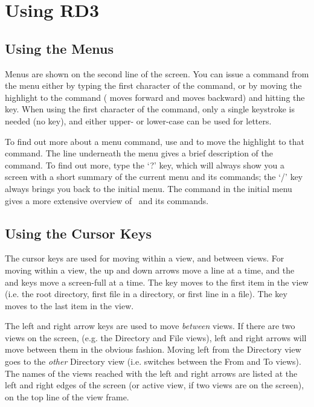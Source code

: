 \chapter{Using RD3}
 
\section{Using the Menus}
 
Menus are shown on the second line of the screen.  You can issue a
command from the menu either by typing the first character of the
command, or by moving the highlight to the command ( moves
forward and  moves backward) and hitting the 
key.  When using the first character of the command, only a single
keystroke is needed (no  key), and either upper- or
lower-case can be used for letters.
 
To find out more about a menu command, use  and
 to move the highlight to that command.  The line
underneath the menu gives a brief description of the command.  To find
out more, type the `?' key, which will always show you a screen with a
short summary of the current menu and its commands; the `/' key always
brings you back to the initial menu.  The  command in
the initial menu gives a more extensive overview of \RD\ and its
commands.


\section{Using the Cursor Keys}
 
The cursor keys are used for moving within a view, and between views. 
For moving within a view, the up and down arrows move a line at a
time, and the  and  keys move a screen-full at a
time.  The  key moves to the first item in the view (i.e.
the root directory, first file in a directory, or first line in a
file).  The  key moves to the last item in the view.
 
The left and right arrow keys are used to move {\em between} views.
If there are two views on the screen, (e.g. the Directory and File
views), left and right arrows will move between them in the obvious
fashion.  Moving left from the Directory view goes to the {\em other}
Directory view (i.e. switches between the From and To views). 
The names of the views reached with the left and right arrows are
listed at the left and right edges of the screen (or active view, if
two views are on the screen), on the top line of the view frame.

